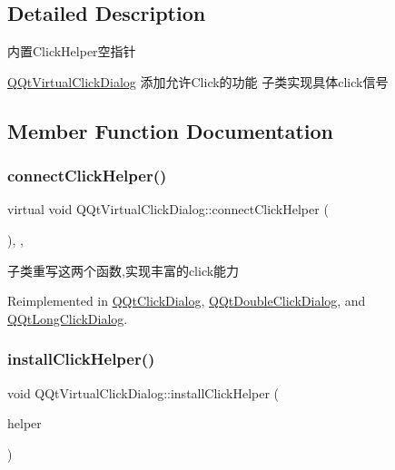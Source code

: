 \subsection{Detailed Description}
内置\+Click\+Helper空指针

\mbox{\hyperlink{class_q_qt_virtual_click_dialog}{Q\+Qt\+Virtual\+Click\+Dialog}} 添加允许\+Click的功能 子类实现具体click信号 

\subsection{Member Function Documentation}
\mbox{\label{class_q_qt_virtual_click_dialog_a93e958d50ddc3fb38ca0e4905673cf74}} 
\subsubsection{\texorpdfstring{connect\+Click\+Helper()}{connectClickHelper()}}
{\footnotesize\ttfamily virtual void Q\+Qt\+Virtual\+Click\+Dialog\+::connect\+Click\+Helper (\begin{DoxyParamCaption}{ }\end{DoxyParamCaption})\hspace{0.3cm}{\ttfamily [inline]}, {\ttfamily [protected]}, {\ttfamily [virtual]}}

子类重写这两个函数,实现丰富的click能力 

Reimplemented in \mbox{\hyperlink{class_q_qt_click_dialog_abe0a809f78f668db917f87ddfc50767f}{Q\+Qt\+Click\+Dialog}}, \mbox{\hyperlink{class_q_qt_double_click_dialog_aeb530bd68159ea4833076b450cb5f4ca}{Q\+Qt\+Double\+Click\+Dialog}}, and \mbox{\hyperlink{class_q_qt_long_click_dialog_a7ecc2043f891de0ed8ce71d99f5860ac}{Q\+Qt\+Long\+Click\+Dialog}}.

\mbox{\label{class_q_qt_virtual_click_dialog_ade58d6bdc539c61304628a9710c4e8b3}} 
\subsubsection{\texorpdfstring{install\+Click\+Helper()}{installClickHelper()}}
{\footnotesize\ttfamily void Q\+Qt\+Virtual\+Click\+Dialog\+::install\+Click\+Helper (\begin{DoxyParamCaption}\item[{\mbox{\hyperlink{class_q_qt_virtual_click_helper}{Q\+Qt\+Virtual\+Click\+Helper}} $\ast$}]{helper }\end{DoxyParamCaption})\hspace{0.3cm}{\ttfamily [inline]}}

